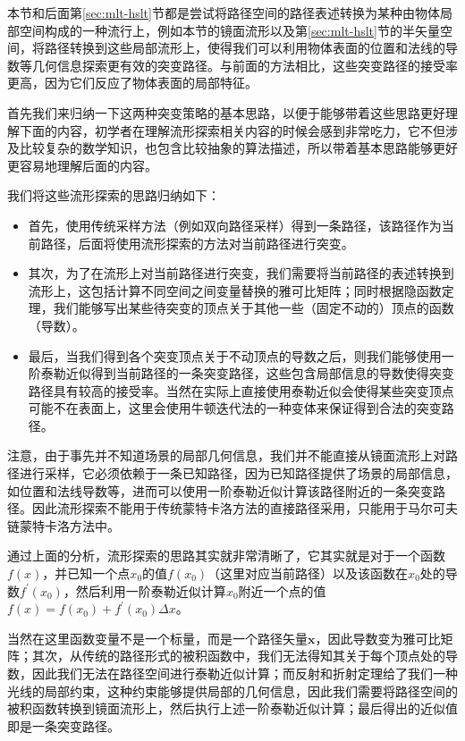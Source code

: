 本节和后面第\ref{sec:mlt-hslt}节都是尝试将路径空间的路径表述转换为某种由物体局部空间构成的一种流行上，例如本节的镜面流形以及第\ref{sec:mlt-hslt}节的半矢量空间，将路径转换到这些局部流形上，使得我们可以利用物体表面的位置和法线的导数等几何信息探索更有效的突变路径。与前面的方法相比，这些突变路径的接受率更高，因为它们反应了物体表面的局部特征。

首先我们来归纳一下这两种突变策略的基本思路，以便于能够带着这些思路更好理解下面的内容，初学者在理解流形探索相关内容的时候会感到非常吃力，它不但涉及比较复杂的数学知识，也包含比较抽象的算法描述，所以带着基本思路能够更好更容易地理解后面的内容。

我们将这些流形探索的思路归纳如下：

\begin{itemize}
	\item 首先，使用传统采样方法（例如双向路径采样）得到一条路径，该路径作为当前路径，后面将使用流形探索的方法对当前路径进行突变。
	\item 其次，为了在流形上对当前路径进行突变，我们需要将当前路径的表述转换到流形上，这包括计算不同空间之间变量替换的雅可比矩阵；同时根据隐函数定理，我们能够写出某些待突变的顶点关于其他一些（固定不动的）顶点的函数（导数）。
	\item 最后，当我们得到各个突变顶点关于不动顶点的导数之后，则我们能够使用一阶泰勒近似得到当前路径的一条突变路径，这些包含局部信息的导数使得突变路径具有较高的接受率。当然在实际上直接使用泰勒近似会使得某些突变顶点可能不在表面上，这里会使用牛顿迭代法的一种变体来保证得到合法的突变路径。
\end{itemize}

\begin{myshaded}
	注意，由于事先并不知道场景的局部几何信息，我们并不能直接从镜面流形上对路径进行采样，它必须依赖于一条已知路径，因为已知路径提供了场景的局部信息，如位置和法线导数等，进而可以使用一阶泰勒近似计算该路径附近的一条突变路径。因此流形探索不能用于传统蒙特卡洛方法的直接路径采用，只能用于马尔可夫链蒙特卡洛方法中。
\end{myshaded}

通过上面的分析，流形探索的思路其实就非常清晰了，它其实就是对于一个函数$f(x)$，并已知一个点$x_0$的值$f(x_0)$（这里对应当前路径）以及该函数在$x_0$处的导数$f^{'}(x_0)$，然后利用一阶泰勒近似计算$x_0$附近一个点的值$f(x)=f(x_0)+f^{'}(x_0)\Delta x$。

当然在这里函数变量不是一个标量，而是一个路径矢量${\mathbf{x}}$，因此导数变为雅可比矩阵；其次，从传统的路径形式的被积函数中，我们无法得知其关于每个顶点处的导数，因此我们无法在路径空间进行泰勒近似计算；而反射和折射定理给了我们一种光线的局部约束，这种约束能够提供局部的几何信息，因此我们需要将路径空间的被积函数转换到镜面流形上，然后执行上述一阶泰勒近似计算；最后得出的近似值即是一条突变路径。

